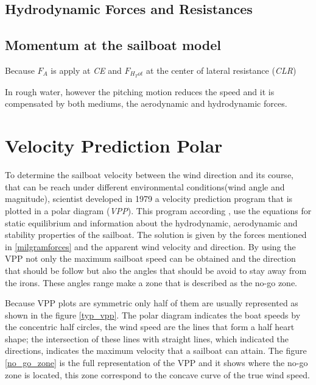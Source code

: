 \subsection{Hydrodynamic Forces and Resistances}

\subsection{Momentum at the sailboat model}
Because $F_{A}$ is apply at \textit{CE} and $F_{H_Tot}$ at the center of lateral resistance (\textit{CLR})

In rough water, however the pitching motion reduces the speed and it is compensated by both mediums, the aerodynamic and hydrodynamic forces.%

\section{Velocity Prediction Polar}
To determine the sailboat velocity between the wind direction and its course, that can be reach under different environmental conditions(wind angle and magnitude), scientist developed in 1979 a velocity prediction program that is plotted in a polar diagram (\textit{VPP}). This program according  \cite{larsonprinciples}, use the equations for static equilibrium and information about the hydrodynamic, aerodynamic and stability properties of the sailboat.  The solution is given by  the forces mentioned in \ref{milgramforces} and the apparent wind velocity and direction. By using the VPP not only the maximum sailboat speed can be obtained and the direction that should be follow but also the angles that should be avoid to stay away from the irons\cite{yang2011control}. These angles range make a zone that is described as the no-go zone.\par 

Because VPP plots are symmetric only half of them are usually represented as shown in the figure \ref {typ_vpp}. The polar diagram indicates the boat speeds by the concentric half circles, the wind speed are the lines that form a half heart shape; the intersection of these lines with straight lines, which indicated the directions, indicates the maximum velocity that a sailboat can attain. The figure \ref{no_go_zone} is the full representation of the VPP and it shows where the no-go zone is located, this zone correspond to the concave curve of the true wind speed.\par 

